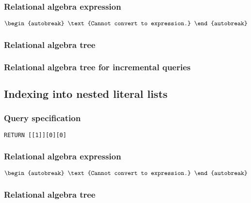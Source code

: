 \subsubsection*{Relational algebra expression}

\begin{align*}
\begin{autobreak}
\text{Cannot convert to expression.}
\end{autobreak}
\end{align*}

\subsubsection*{Relational algebra tree}


\subsubsection*{Relational algebra tree for incremental queries}


\subsection{Indexing into nested literal lists}

\subsubsection*{Query specification}

\begin{lstlisting}
RETURN [[1]][0][0]
\end{lstlisting}

\subsubsection*{Relational algebra expression}

\begin{align*}
\begin{autobreak}
\text{Cannot convert to expression.}
\end{autobreak}
\end{align*}

\subsubsection*{Relational algebra tree}

